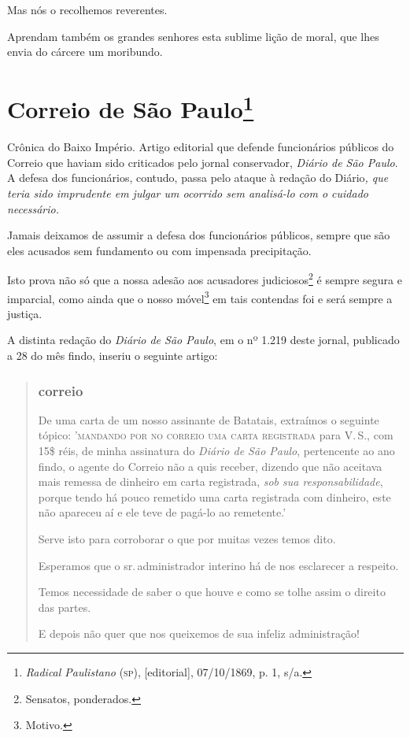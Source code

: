 Mas nós o recolhemos reverentes.

\noindent\dotfill

Aprendam também os grandes senhores esta sublime lição de moral, que
lhes envia do cárcere um moribundo.

\chapter{Correio de São Paulo\footnote{\emph{Radical Paulistano} (\textsc{sp}),
  {[}editorial{]}, 07/10/1869, p. 1, s/a.}}

\begin{didascalia}
Crônica do Baixo Império. Artigo editorial que defende funcionários
públicos do Correio que haviam sido criticados pelo jornal
conservador,\emph{ Diário de São Paulo}. A defesa dos funcionários,
contudo, passa pelo ataque à redação do Diário\emph{, que teria sido
imprudente em julgar um ocorrido sem analisá-lo com o cuidado
necessário.}
\end{didascalia}



Jamais deixamos de assumir a defesa dos funcionários públicos, sempre
que são eles acusados sem fundamento ou com impensada precipitação.

Isto prova não só que a nossa adesão aos acusadores
judiciosos\footnote{Sensatos, ponderados.} é sempre segura e
imparcial, como ainda que o nosso móvel\footnote{Motivo.} em tais
contendas foi e será sempre a justiça.

A distinta redação do \emph{Diário de São Paulo}, em o nº 1.219 deste
jornal, publicado a 28 do mês findo, inseriu o seguinte artigo:

\begin{quote}
\subsection{correio}

De uma carta de um nosso assinante de Batatais, extraímos o seguinte
tópico: '\textsc{mandando por no correio uma carta registrada} para V.\,S., com
15\$ réis, de minha assinatura do \emph{Diário de São Paulo}, pertencente
ao ano findo, o agente do Correio não a quis receber, dizendo que não
aceitava mais remessa de dinheiro em carta registrada, \emph{sob sua
responsabilidade}, porque tendo há pouco remetido uma carta registrada
com dinheiro, este não apareceu aí e ele teve de pagá-lo ao remetente.'

Serve isto para corroborar o que por muitas vezes temos dito.

Esperamos que o sr.\,administrador interino há de nos esclarecer a
respeito.

Temos necessidade de saber o que houve e como se tolhe assim o direito
das partes.

E depois não quer que nos queixemos de sua infeliz administração!
\end{quote}

